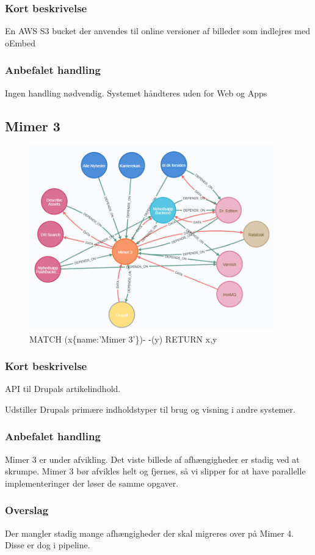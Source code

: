 \documentclass{article}
\begin{document}
\subsubsection{Kort beskrivelse}
En AWS S3 bucket der anvendes til online versioner af billeder som indlejres med oEmbed
\subsubsection{Anbefalet handling}
Ingen handling nødvendig. Systemet håndteres uden for Web og Apps



\subsection{Mimer 3}
\begin{figure}[h]
\includegraphics[width=300pt]{Mimer3.PNG}
\caption{MATCH (x\{name:'Mimer 3'\})- -(y) RETURN x,y}
\end{figure}
\subsubsection{Kort beskrivelse}
API til Drupals artikelindhold.

Udstiller Drupals primære indholdstyper til brug og visning i andre systemer.
\subsubsection{Anbefalet handling}
Mimer 3 er under afvikling. Det viste billede af afhængigheder er stadig ved at skrumpe. Mimer 3 bør afvikles helt og fjernes, så vi slipper for at have parallelle implementeringer der løser de samme opgaver.
\subsubsection{Overslag}
Der mangler stadig mange afhængigheder der skal migreres over på Mimer 4. Disse er dog i pipeline.
\end{document}
